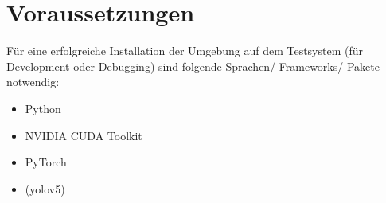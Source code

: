 \chapter{Voraussetzungen}

Für eine erfolgreiche Installation der Umgebung auf dem Testsystem (für Development oder Debugging) sind folgende Sprachen/ Frameworks/ Pakete notwendig:
\begin{itemize}
    \item Python
    \item NVIDIA CUDA Toolkit 
    \item PyTorch
    \item (yolov5)
\end{itemize}